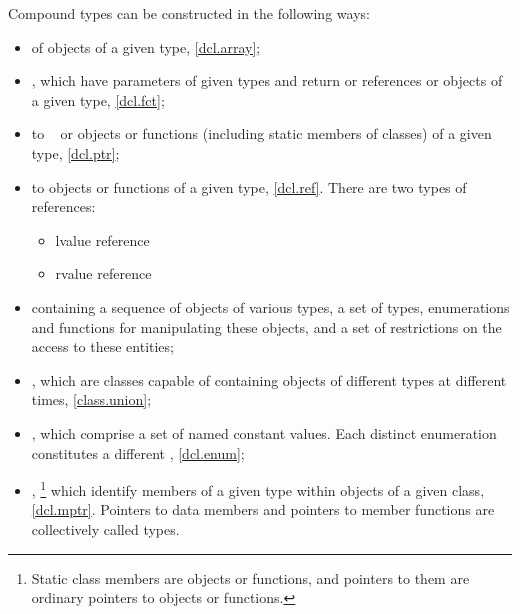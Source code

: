 \pnum
{}%
Compound types can be constructed in the following ways:
\begin{itemize}
\item {} of objects of a given type, \ref{dcl.array};

\item {}, which have parameters of given types and return
 or references or objects of a given type, \ref{dcl.fct};

\item {} to \cv{}~ or objects or functions (including
static members of classes) of a given type, \ref{dcl.ptr};

\item %
%
%
 to objects or functions of a given
type, \ref{dcl.ref}. There are two types of references:
\begin{itemize}
\item lvalue reference
\item rvalue reference
\end{itemize}

\item
{} containing a sequence of objects of various types,
a set of types, enumerations and functions for
manipulating these objects, and a set of restrictions
on the access to these entities;

\item
{}, which are classes capable of containing objects of
different types at different times, \ref{class.union};

\item
{}, which comprise a set of named constant values.
Each distinct enumeration constitutes a different
, \ref{dcl.enum};

\item {}%
,%
\footnote{Static class members are objects or functions, and pointers to them are
ordinary pointers to objects or functions.}
which identify members of a given
type within objects of a given class, \ref{dcl.mptr}.
Pointers to data members and pointers to member functions are collectively
called  types.
\end{itemize}

